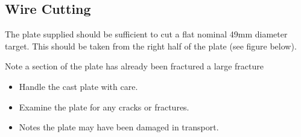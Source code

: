 \subsection{Wire Cutting}
The plate supplied should be sufficient to cut a flat nominal 49mm diameter target. This should be taken from the right half of the plate (see figure below).

Note a section of the plate has already been fractured a large fracture 
\begin{itemize}
\item Handle the cast plate with care. 
\item Examine the plate for any cracks or fractures. 
\item Notes the plate may have been damaged in transport. 
\end{itemize}